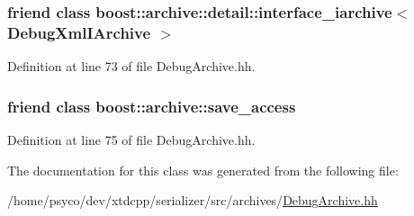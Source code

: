 \subsubsection[{\texorpdfstring{boost\+::archive\+::detail\+::interface\+\_\+iarchive$<$ Debug\+Xml\+I\+Archive $>$}{boost::archive::detail::interface_iarchive< DebugXmlIArchive >}}]{\setlength{\rightskip}{0pt plus 5cm}friend class boost\+::archive\+::detail\+::interface\+\_\+iarchive$<$ {\bf Debug\+Xml\+I\+Archive} $>$\hspace{0.3cm}{\ttfamily [friend]}}\hypertarget{classxtd_1_1serializer_1_1DebugXmlIArchive_a54f75e33da74496cd06e608f4bec85dc}{}\label{classxtd_1_1serializer_1_1DebugXmlIArchive_a54f75e33da74496cd06e608f4bec85dc}


Definition at line 73 of file Debug\+Archive.\+hh.

\subsubsection[{\texorpdfstring{boost\+::archive\+::save\+\_\+access}{boost::archive::save_access}}]{\setlength{\rightskip}{0pt plus 5cm}friend class boost\+::archive\+::save\+\_\+access\hspace{0.3cm}{\ttfamily [friend]}}\hypertarget{classxtd_1_1serializer_1_1DebugXmlIArchive_aaca003bb8a4fc59424e4025130da4edd}{}\label{classxtd_1_1serializer_1_1DebugXmlIArchive_aaca003bb8a4fc59424e4025130da4edd}


Definition at line 75 of file Debug\+Archive.\+hh.



The documentation for this class was generated from the following file\+:\begin{DoxyCompactItemize}
\item 
/home/psyco/dev/xtdcpp/serializer/src/archives/\hyperlink{DebugArchive_8hh}{Debug\+Archive.\+hh}\end{DoxyCompactItemize}
